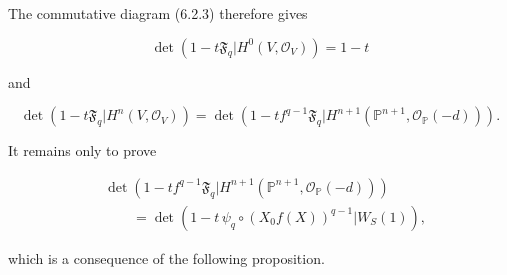 The commutative diagram (6.2.3) therefore gives

\begin{equation}\tag{6.2.6}
\det\!\left(1-t\mathfrak F_q
\mathrel{\Big|}H^0(V,\mathcal O_V)\right)=1-t
\end{equation}

and

\begin{equation}\tag{6.2.7}
\det\!\left(1-t\mathfrak F_q
\mathrel{\Big|}H^n(V,\mathcal O_V)\right)
=
\det\!\left(
1-tf^{q-1}\mathfrak F_q
\mathrel{\Big|}
H^{n+1}(\mathbb P^{n+1},\mathcal O_{\mathbb P}(-d))
\right).
\end{equation}

It remains only to prove

\begin{equation}\tag{6.2.8}
\begin{aligned}
&\det\!\left(
1-tf^{q-1}\mathfrak F_q
\mathrel{\Big|}
H^{n+1}(\mathbb P^{n+1},\mathcal O_{\mathbb P}(-d))
\right)\\
&\qquad=
\det\!\left(
1-t\,\psi_q\circ(X_0f(X))^{q-1}
\mathrel{\Big|}W_S(1)
\right),
\end{aligned}
\end{equation}

which is a consequence of the following proposition.

